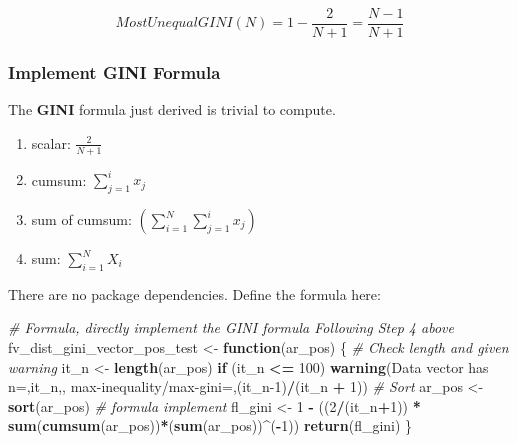 \documentclass[
]{book}
\newenvironment{Shaded}{\begin{snugshade}}{\end{snugshade}}
\newcommand{\CommentTok}[1]{\textcolor[rgb]{0.56,0.35,0.01}{\textit{#1}}}
\newcommand{\ControlFlowTok}[1]{\textcolor[rgb]{0.13,0.29,0.53}{\textbf{#1}}}
\newcommand{\DecValTok}[1]{\textcolor[rgb]{0.00,0.00,0.81}{#1}}
\newcommand{\KeywordTok}[1]{\textcolor[rgb]{0.13,0.29,0.53}{\textbf{#1}}}
\newcommand{\NormalTok}[1]{#1}
\newcommand{\OperatorTok}[1]{\textcolor[rgb]{0.81,0.36,0.00}{\textbf{#1}}}
\newcommand{\StringTok}[1]{\textcolor[rgb]{0.31,0.60,0.02}{#1}}
\providecommand{\tightlist}{%
  \setlength{\itemsep}{0pt}\setlength{\parskip}{0pt}}
\begin{document}
\[
 MostUnequalGINI\left(N\right) = 1 - \frac{2}{N+1} = \frac{N-1}{N+1}
\]

\hypertarget{implement-gini-formula}{%
\subsubsection{Implement GINI Formula}\label{implement-gini-formula}}

The \textbf{GINI} formula just derived is trivial to compute.

\begin{enumerate}
\def\labelenumi{\arabic{enumi}.}
\tightlist
\item
  scalar: \(\frac{2}{N+1}\)
\item
  cumsum: \(\sum_{j=1}^{i} x_j\)
\item
  sum of cumsum: \(\left(\sum_{i=1}^N \sum_{j=1}^{i} x_j\right)\)
\item
  sum: \(\sum_{i=1}^N X_i\)
\end{enumerate}

There are no package dependencies. Define the formula here:

\begin{Shaded}
\begin{Highlighting}[]
\CommentTok{\# Formula, directly implement the GINI formula Following Step 4 above}
\NormalTok{fv\_dist\_gini\_vector\_pos\_test \textless{}{-}}\StringTok{ }\ControlFlowTok{function}\NormalTok{(ar\_pos) \{}
  \CommentTok{\# Check length and given warning}
\NormalTok{  it\_n \textless{}{-}}\StringTok{ }\KeywordTok{length}\NormalTok{(ar\_pos)}
  \ControlFlowTok{if}\NormalTok{ (it\_n }\OperatorTok{\textless{}=}\StringTok{ }\DecValTok{100}\NormalTok{)  }\KeywordTok{warning}\NormalTok{(}\StringTok{\textquotesingle{}Data vector has n=\textquotesingle{}}\NormalTok{,it\_n,}\StringTok{\textquotesingle{}, max{-}inequality/max{-}gini=\textquotesingle{}}\NormalTok{,(it\_n}\DecValTok{{-}1}\NormalTok{)}\OperatorTok{/}\NormalTok{(it\_n }\OperatorTok{+}\StringTok{ }\DecValTok{1}\NormalTok{))}
  \CommentTok{\# Sort}
\NormalTok{  ar\_pos \textless{}{-}}\StringTok{ }\KeywordTok{sort}\NormalTok{(ar\_pos)}
  \CommentTok{\# formula implement}
\NormalTok{  fl\_gini \textless{}{-}}\StringTok{ }\DecValTok{1} \OperatorTok{{-}}\StringTok{ }\NormalTok{((}\DecValTok{2}\OperatorTok{/}\NormalTok{(it\_n}\OperatorTok{+}\DecValTok{1}\NormalTok{)) }\OperatorTok{*}\StringTok{ }\KeywordTok{sum}\NormalTok{(}\KeywordTok{cumsum}\NormalTok{(ar\_pos))}\OperatorTok{*}\NormalTok{(}\KeywordTok{sum}\NormalTok{(ar\_pos))}\OperatorTok{\^{}}\NormalTok{(}\OperatorTok{{-}}\DecValTok{1}\NormalTok{))}
  \KeywordTok{return}\NormalTok{(fl\_gini)}
\NormalTok{\}}
\end{Highlighting}
\end{Shaded}
\end{document}

